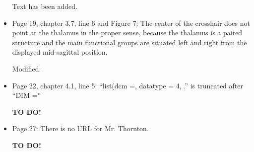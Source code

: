 \documentclass[11pt]{article}
\begin{document}
\begin{itemize}
  Text has been added.

\item Page 19, chapter 3.7, line 6 and Figure 7: The center of the
  crosshair does not point at the thalamus in the proper sense,
  because the thalamus is a paired structure and the main functional
  groups are situated left and right from the displayed mid-sagittal
  position.

  Modified.

\item Page 22, chapter 4.1, line 5: ``list(dcm =, datatype = 4, .'' is
  truncated after ``DIM =''

  \textbf{TO DO!}

\item Page 27: There is no URL for Mr. Thornton.

  \textbf{TO DO!}

\end{itemize}




\end{document}
